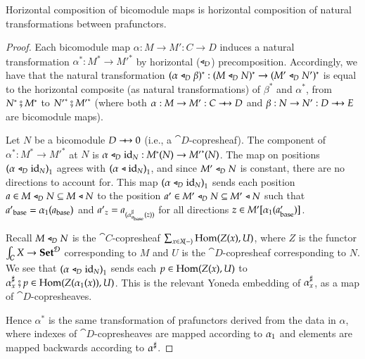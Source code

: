 \documentclass{amsart}
\begin{document}
\begin{prop}
  Horizontal composition of bicomodule maps is horizontal composition
  of natural transformations between prafunctors.
\end{prop}
\begin{proof}
  Each bicomodule map $\alpha: M \to M': C \to D$ induces a natural
  transformation $\alpha^*:M^* \to {M'}^*$ by horizontal ($\mathrel{\triangleleft}_D$)
  precomposition. Accordingly, we have that the natural transformation
  $(\alpha \mathrel{\triangleleft}_D \beta)^*: (M \mathrel{\triangleleft}_D N)^* \to (M' \mathrel{\triangleleft}_D N')^*$ is
  equal to the horizontal composite (as natural transformations) of
  $\beta^*$ and $\alpha^*$, from $N^* \fatsemi M^*$ to
  ${N'}^* \fatsemi {M'}^*$ (where both $\alpha: M \to M': C \bim D$
  and $\beta: N \to N': D \bim E$ are bicomodule maps).

  Let $N$ be a bicomodule $D \bim 0$ (i.e., a
  $\cat{D}$-copresheaf). The component of $\alpha^*: M^* \to {M'}^*$
  at $N$ is $\alpha \mathrel{\triangleleft}_D \mathrm{id}_N: M^*(N) \to {M'}^*(N)$. The map on
  positions ${(\alpha \mathrel{\triangleleft}_D \mathrm{id}_N)}_1$ agrees with
  ${(\alpha \mathrel{\triangleleft} \mathrm{id}_N)}_1$, and since $M' \mathrel{\triangleleft}_D N$ is constant,
  there are no directions to account for. This map
  ${(\alpha \mathrel{\triangleleft}_D \mathrm{id}_N)}_1$ sends each position
  ${a \in M \mathrel{\triangleleft}_D N \subseteq M \mathrel{\triangleleft} N}$ to the position
  ${a' \in M' \mathrel{\triangleleft}_D N \subseteq M' \mathrel{\triangleleft} N}$ such that
  ${a'}_{\mathrm{base}} = {\alpha}_1(a_{\mathrm{base}})$ and
  ${{a'}_z = a_{({\alpha}^\sharp_{a_{\mathrm{base}}}(z))}}$ for all directions
  $z \in M'[{\alpha}_1(a'_{\mathrm{base}})]$.

  Recall $M \mathrel{\triangleleft}_D N$ is the $\cat{C}$-copresheaf
  $\sum_{x \in X\!(-)} \operatorname{Hom}(Z(x),U)$, where $Z$ is the functor
  $\int_{\mathcal{C}}X \to {\normalfont\mathbf{Set}}^{\mathcal{D}}$ corresponding to $M$ and $U$ is
  the $\cat{D}$-copresheaf corresponding to $N$. We see that
  ${(\alpha \mathrel{\triangleleft}_D \mathrm{id}_N)}_1$ sends each ${p \in \operatorname{Hom}(Z(x),U)}$
  to
  ${\alpha}^\sharp_{x} \fatsemi {p \in
    \operatorname{Hom}(Z({\alpha}_1(x)),U)}$. This is the relevant Yoneda
  embedding of ${\alpha}^\sharp_{x}$, as a map of
  $\cat{D}$-copresheaves.

  Hence $\alpha^*$ is the same transformation of prafunctors derived
  from the data in $\alpha$, where indexes of $\cat{D}$-copresheaves
  are mapped according to ${\alpha}_1$ and elements are mapped
  backwards according to ${\alpha}^\sharp$.
\end{proof}
\end{document}
